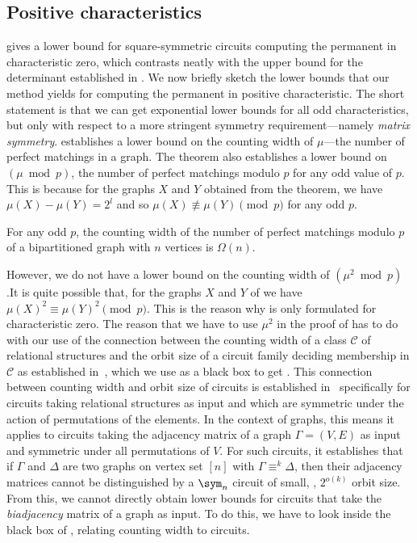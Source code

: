 \documentclass{toc}
\begin{document}
\subsection{Positive characteristics}\label{sec:positive-char}
 gives a lower bound for
square-symmetric %
%
circuits computing the permanent in characteristic zero, which contrasts neatly with the upper bound for the determinant established in .  We now briefly sketch the lower bounds that our method yields for computing the permanent in positive characteristic.  The short statement is that we can get exponential lower bounds for all odd characteristics, but only with respect to a more stringent symmetry requirement---namely \emph{matrix symmetry}.
 establishes a lower bound on the counting width of $\mu$---the number of perfect matchings in a graph.  The theorem also establishes a lower bound on $(\mu \bmod p)$, the number of perfect matchings modulo $p$ for any odd value of $p$.  This is because for the graphs $X$ and $Y$ obtained from the theorem, we have $\mu(X) - \mu(Y) = 2^l$ and so $\mu(X) \not\equiv \mu(Y) \pmod p$ for any odd $p$.
\begin{corollary}\label{cor:modp-width}
  For any odd $p$, the counting width of the number of perfect matchings modulo $p$ of a bipartitioned graph with $n$ vertices is $\Omega(n)$.
\end{corollary}
However, we do not have a lower bound on the counting width of $(\mu^2 \bmod p)$.It is quite possible that, for the graphs $X$ and $Y$ of  we have $\mu(X)^2 \equiv \mu(Y)^2 \pmod p$.  This is the reason why  is only formulated for characteristic zero.
The reason that we have to use $\mu^2$ in the proof of
 has to do with our use of the
connection between the counting width of a class $\mathcal{C}$ of
relational structures and the orbit size of a circuit family deciding
membership in $\mathcal{C}$ as established in~\cite{AndersonD17},
which we use as a black box to get .  This
connection between counting width and orbit size of circuits is
established in~\cite{AndersonD17} specifically for circuits taking
relational structures as input and which are symmetric under the
action of permutations of the elements.  In the context of graphs, this means it applies to circuits taking the adjacency matrix of a graph $\Gamma = (V,E)$ as input and symmetric under all permutations of $V$.  For such circuits, it establishes that if $\Gamma$ and $\Delta$ are two graphs on vertex set $[n]$ with $\Gamma \equiv^k \Delta$, then their adjacency matrices cannot be distinguished by a $\sym_n$ circuit of small, \ie, $2^{o(k)}$ orbit size.  From this, we cannot directly obtain lower bounds for circuits that take the \emph{biadjacency} matrix of a graph as input.  To do this, we have to look inside the black box of , relating counting width to circuits.
\end{document}
